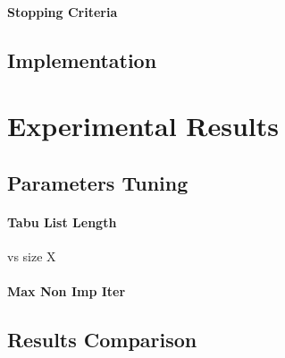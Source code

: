 \documentclass{article}
\begin{document}
\paragraph{Stopping Criteria}

\subsection{Implementation}

\section{Experimental Results}

\subsection{Parameters Tuning}
\paragraph{Tabu List Length} vs size X 
\paragraph{Max Non Imp Iter}

\subsection{Results Comparison}
\end{document}
